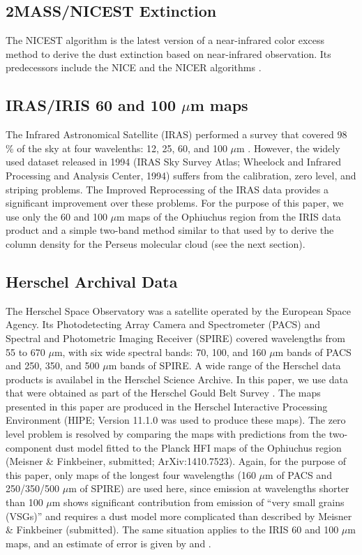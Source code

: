 \documentclass{emulateapj}
\begin{document}
\subsection{2MASS/NICEST Extinction}
The NICEST algorithm is the latest version of a near-infrared color excess method to derive the dust extinction based on near-infrared observation. Its predecessors include the NICE and the NICER algorithms \citep{Lombardi_2001,Lombardi_2005}.

\subsection{IRAS/IRIS 60 and 100 $\mu$m maps}
The Infrared Astronomical Satellite (IRAS) performed a survey that covered 98 \% of the sky at four wavelenths: 12, 25, 60, and 100 $\mu$m \citep{Neugebauer_1984}. However, the widely used dataset released in 1994 (IRAS Sky Survey Atlas; Wheelock and Infrared Processing and Analysis Center, 1994) suffers from the calibration, zero level, and striping problems. The Improved Reprocessing of the IRAS data \citep[IRIS;]{Miville_Deschenes_2005} provides a significant improvement over these problems. For the purpose of this paper, we use only the 60 and 100 $\mu$m maps of the Ophiuchus region from the IRIS data product and a simple two-band method similar to that used by \citet{Schnee_2008} to derive the column density for the Perseus molecular cloud (see the next section).

\subsection{Herschel Archival Data}
The Herschel Space Observatory was a satellite operated by the European Space Agency. Its Photodetecting Array Camera and Spectrometer (PACS) and Spectral and Photometric Imaging Receiver (SPIRE) covered wavelengths from 55 to 670 $\mu$m, with six wide spectral bands: 70, 100, and 160 $\mu$m bands of PACS and 250, 350, and 500 $\mu$m bands of SPIRE. A wide range of the Herschel data products is availabel in the Herschel Science Archive. In this paper, we use data that were obtained as part of the Herschel Gould Belt Survey \citep{Andr__2010}. The maps presented in this paper are produced in the Herschel Interactive Processing Environment (HIPE; Version 11.1.0 was used to produce these maps). The zero level problem is resolved by comparing the maps with predictions from the two-component dust model fitted to the Planck HFI maps of the Ophiuchus region (Meisner \& Finkbeiner, submitted; ArXiv:1410.7523). Again, for the purpose of this paper, only maps of the longest four wavelengths (160 $\mu$m of PACS and 250/350/500 $\mu$m of SPIRE) are used here, since emission at wavelengths shorter than 100 $\mu$m shows significant contribution from emission of ``very small grains (VSGs)'' and requires a dust model more complicated than described by Meisner \& Finkbeiner (submitted). The same situation applies to the IRIS 60 and 100 $\mu$m maps, and an estimate of error is given by \citet{Schnee_2006} and \citet{Schnee_2007}.
\end{document}
